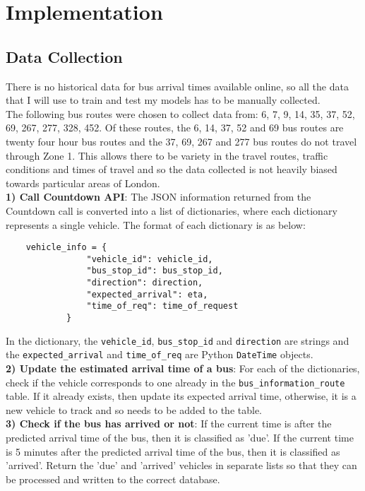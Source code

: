 \section{Implementation}

\subsection{Data Collection}

There is no historical data for bus arrival times available online, so all the data that I will use to train and test my models has to be manually collected. \\

The following bus routes were chosen to collect data from: 6, 7, 9, 14, 35, 37, 52, 69, 267, 277, 328, 452. Of these routes, the 6, 14, 37, 52 and 69 bus routes are twenty four hour bus routes and the 37, 69, 267 and 277 bus routes do not travel through Zone 1. This allows there to be variety in the travel routes, traffic conditions and times of travel and so the data collected is not heavily biased towards particular areas of London. \\

\textbf{1) Call Countdown API}: The JSON information returned from the Countdown call is converted into a list of dictionaries, where each dictionary represents a single vehicle. The format of each dictionary is as below:

\begin{lstlisting}
    vehicle_info = {
                "vehicle_id": vehicle_id,
                "bus_stop_id": bus_stop_id,
                "direction": direction,
                "expected_arrival": eta,
                "time_of_req": time_of_request
            }
\end{lstlisting}

In the dictionary, the \texttt{vehicle\_id}, \texttt{bus\_stop\_id} and \texttt{direction} are strings and the \texttt{expected\_arrival} and \texttt{time\_of\_req} are Python \texttt{DateTime} objects. \\

\textbf{2) Update the estimated arrival time of a bus}: For each of the dictionaries, check if the vehicle corresponds to one already in the \texttt{bus\_information\_route} table. If it already exists, then update its expected arrival time, otherwise, it is a new vehicle to track and so needs to be added to the table. \\

\textbf{3) Check if the bus has arrived or not}:  If the current time is after the predicted arrival time of the bus, then it is classified as 'due'. If the current time is 5 minutes after the predicted arrival time of the bus, then it is classified as 'arrived'. Return the 'due' and 'arrived' vehicles in separate lists so that they can be processed and written to the correct database. \\

